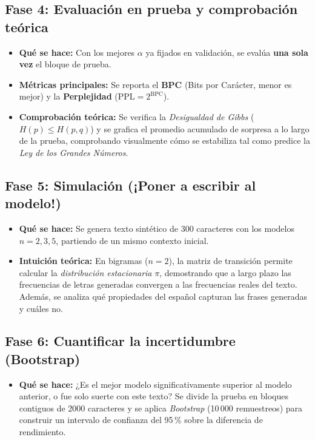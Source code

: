 \documentclass[11pt,letterpaper]{article}
\begin{document}
\subsection*{Fase 4: Evaluación en prueba y comprobación teórica}
\begin{itemize}[leftmargin=0.8cm, itemsep=1pt, parsep=0pt]
    \item \textbf{Qué se hace:} Con los mejores $\alpha$ ya fijados en validación, se evalúa \textbf{una sola vez} el bloque de prueba.
    \item \textbf{Métricas principales:} Se reporta el \textbf{BPC} (Bits por Carácter, menor es mejor) y la \textbf{Perplejidad} ($\text{PPL} = 2^{\text{BPC}}$).
    \item \textbf{Comprobación teórica:} Se verifica la \textit{Desigualdad de Gibbs} ($H(p) \le H(p,q)$) y se grafica el promedio acumulado de sorpresa a lo largo de la prueba, comprobando visualmente cómo se estabiliza tal como predice la \textit{Ley de los Grandes Números}.
\end{itemize}

\subsection*{Fase 5: Simulación (¡Poner a escribir al modelo!)}
\begin{itemize}[leftmargin=0.8cm, itemsep=1pt, parsep=0pt]
    \item \textbf{Qué se hace:} Se genera texto sintético de 300 caracteres con los modelos $n = 2, 3, 5$, partiendo de un mismo contexto inicial.
    \item \textbf{Intuición teórica:} En bigramas ($n=2$), la matriz de transición permite calcular la \textit{distribución estacionaria} $\pi$, demostrando que a largo plazo las frecuencias de letras generadas convergen a las frecuencias reales del texto. Además, se analiza qué propiedades del español capturan las frases generadas y cuáles no.
\end{itemize}

\subsection*{Fase 6: Cuantificar la incertidumbre (Bootstrap)}
\begin{itemize}[leftmargin=0.8cm, itemsep=1pt, parsep=0pt]
    \item \textbf{Qué se hace:} ¿Es el mejor modelo significativamente superior al modelo anterior, o fue solo suerte con este texto? Se divide la prueba en bloques contiguos de 2000 caracteres y se aplica \textit{Bootstrap} (10\,000 remuestreos) para construir un intervalo de confianza del 95\,\% sobre la diferencia de rendimiento.
\end{itemize}
\end{document}
